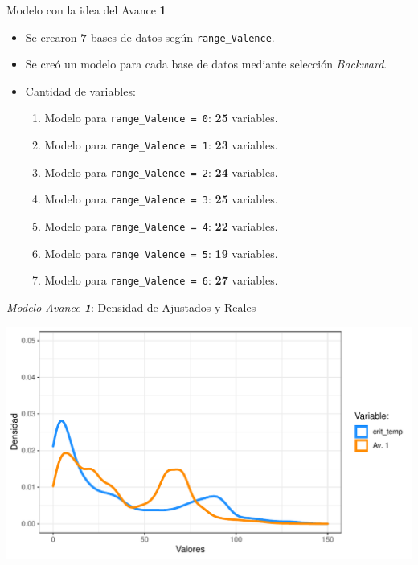 \documentclass[11pt]{beamer}\usepackage{knitr}
\newcommand{\cod}[1]{\texttt{\frenchspacing#1}}
\begin{document}
\begin{frame}{Modelo con la idea del Avance \textbf{1}}
	\begin{itemize}
		\item Se crearon \textbf{7} bases de datos según \cod{range\_Valence}.
		\pause
		\item Se creó un modelo para cada base de datos mediante selección \textit{Backward}.
		\pause
		\item Cantidad de variables:
		\begin{enumerate}
			\item Modelo para \cod{range\_Valence = 0}: \textbf{25} variables.
			\item Modelo para \cod{range\_Valence = 1}: \textbf{23} variables.
			\item Modelo para \cod{range\_Valence = 2}: \textbf{24} variables.
			\item Modelo para \cod{range\_Valence = 3}: \textbf{25} variables.
			\item Modelo para \cod{range\_Valence = 4}: \textbf{22} variables.
			\item Modelo para \cod{range\_Valence = 5}: \textbf{19} variables.
			\item Modelo para \cod{range\_Valence = 6}: \textbf{27} variables.
		\end{enumerate}
	\end{itemize}
\end{frame}

\begin{frame}[fragile]{\textit{Modelo Avance \textbf{1}}: Densidad de Ajustados y Reales}

\begin{knitrout}\footnotesize
{}\color{fgcolor}

{\centering \includegraphics[width=\maxwidth]{figure/unnamed-chunk-2-1} 

}



\end{knitrout}


	\end{frame}
\end{document}
